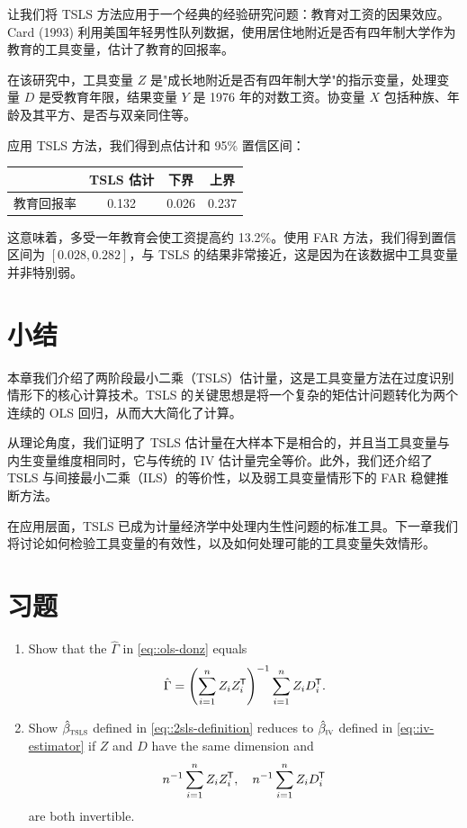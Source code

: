 让我们将 TSLS 方法应用于一个经典的经验研究问题：教育对工资的因果效应。Card (1993) 利用美国年轻男性队列数据，使用居住地附近是否有四年制大学作为教育的工具变量，估计了教育的回报率。

在该研究中，工具变量 $Z$ 是"成长地附近是否有四年制大学"的指示变量，处理变量 $D$ 是受教育年限，结果变量 $Y$ 是 1976 年的对数工资。协变量 $X$ 包括种族、年龄及其平方、是否与双亲同住等。

应用 TSLS 方法，我们得到点估计和 95\% 置信区间：
\begin{center}
\begin{tabular}{lccc}
\hline
 & TSLS 估计 & 下界 & 上界 \\
\hline
教育回报率 & 0.132 & 0.026 & 0.237 \\
\hline
\end{tabular}
\end{center}

这意味着，多受一年教育会使工资提高约 13.2\%。使用 FAR 方法，我们得到置信区间为 $[0.028, 0.282]$，与 TSLS 的结果非常接近，这是因为在该数据中工具变量并非特别弱。

\section{小结}\label{sec:TSLS-summary}

本章我们介绍了两阶段最小二乘（TSLS）估计量，这是工具变量方法在过度识别情形下的核心计算技术。TSLS 的关键思想是将一个复杂的矩估计问题转化为两个连续的 OLS 回归，从而大大简化了计算。

从理论角度，我们证明了 TSLS 估计量在大样本下是相合的，并且当工具变量与内生变量维度相同时，它与传统的 IV 估计量完全等价。此外，我们还介绍了 TSLS 与间接最小二乘（ILS）的等价性，以及弱工具变量情形下的 FAR 稳健推断方法。

在应用层面，TSLS 已成为计量经济学中处理内生性问题的标准工具。下一章我们将讨论如何检验工具变量的有效性，以及如何处理可能的工具变量失效情形。

\section{习题}\label{sec:23-homework}

\begin{HomeworkProblem}\label{exr:23-1}

\begin{enumerate}
\item
Show that the $\hat \Gamma$ in \eqref{eq::ols-donz} equals
\[
\hat{\Gamma} = \left(  \sum_{i=1}^n Z_i Z_i^{\mkern-1.5mu\mathsf{T}}  \right)^{-1} \sum_{i=1}^n Z_i D_i^{\mkern-1.5mu\mathsf{T}} .
\]

\item
Show $\hat{\beta}_\textsc{tsls} $ defined in \eqref{eq::2sls-definition} reduces to $ \hat{\beta}_\textsc{iv}$ defined in \eqref{eq::iv-estimator} if $Z$ and $D$ have the same dimension and
\[
n^{-1} \sum_{i=1}^n Z_i Z_i^{\mkern-1.5mu\mathsf{T}}, \quad n^{-1} \sum_{i=1}^n Z_i D_i^{\mkern-1.5mu\mathsf{T}}
\]
are both invertible.
\end{enumerate}

\end{HomeworkProblem}

